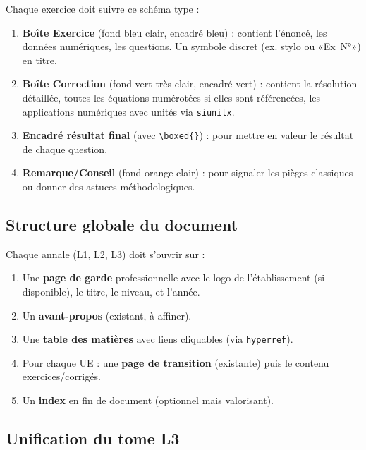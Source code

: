 \documentclass[12pt,a4paper]{article}
\begin{document}
\begin{recommandation}[title=Structure des exercices recommandée]
Chaque exercice doit suivre ce schéma type :

\begin{enumerate}
  \item \textbf{Boîte Exercice} (fond bleu clair, encadré bleu) : contient l'énoncé, les données numériques, les questions. Un symbole discret (ex. stylo ou «Ex~N°») en titre.
  \item \textbf{Boîte Correction} (fond vert très clair, encadré vert) : contient la résolution détaillée, toutes les équations numérotées si elles sont référencées, les applications numériques avec unités via \verb|siunitx|.
  \item \textbf{Encadré résultat final} (avec \verb|\boxed{}|) : pour mettre en valeur le résultat de chaque question.
  \item \textbf{Remarque/Conseil} (fond orange clair) : pour signaler les pièges classiques ou donner des astuces méthodologiques.
\end{enumerate}
\end{recommandation}

\subsection{Structure globale du document}

\begin{recommandation}
Chaque annale (L1, L2, L3) doit s'ouvrir sur :
\begin{enumerate}
  \item Une \textbf{page de garde} professionnelle avec le logo de l'établissement (si disponible), le titre, le niveau, et l'année.
  \item Un \textbf{avant-propos} (existant, à affiner).
  \item Une \textbf{table des matières} avec liens cliquables (via \verb|hyperref|).
  \item Pour chaque UE : une \textbf{page de transition} (existante) puis le contenu exercices/corrigés.
  \item Un \textbf{index} en fin de document (optionnel mais valorisant).
\end{enumerate}
\end{recommandation}

\subsection{Unification du tome L3}
\end{document}

